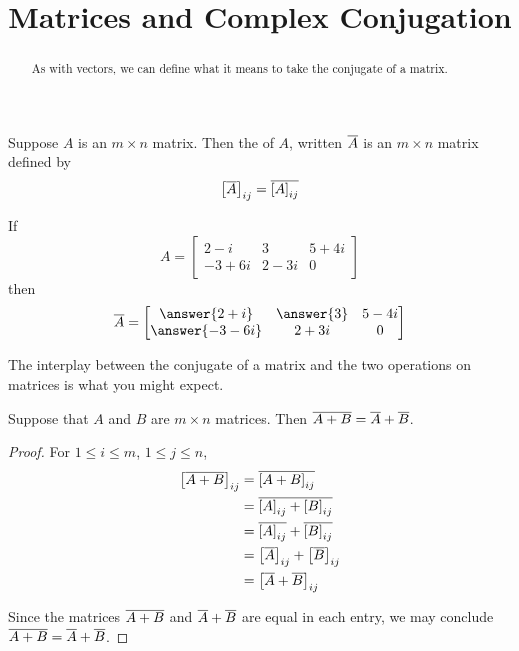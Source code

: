 \documentclass{ximera}
\title{Matrices and Complex Conjugation}
\begin{document}
\begin{abstract}
  As with vectors, we can define what it means to take the conjugate of a matrix.
\end{abstract}
\maketitle

\begin{definition}
Suppose $A$ is an $m\times n$ matrix.  Then the  of $A$, written $\overline{A}$ is an $m\times n$ matrix defined by
\[
\left\lbrack\overline{A}\right\rbrack_{ij}=\overline{\left\lbrack A\right\rbrack_{ij}}
\]
\end{definition}

\begin{example}
If
\[
A=
\begin{bmatrix}
2-i & 3 & 5+4i\\
-3+6i & 2-3i & 0
\end{bmatrix}
\]
then
\[
\conjugate{A}=
\begin{bmatrix}
\answer{2+i} & \answer{3} & 5-4i\\
\answer{-3-6i} & 2+3i & 0
\end{bmatrix}
\]

\end{example}

The interplay between the conjugate of a matrix and the two operations
on matrices is what you might expect.


\begin{theorem}
\label{theorem:CRMA}

Suppose that $A$ and $B$ are $m\times n$ matrices.  Then $\overline{A+B}=\overline{A}+\overline{B}$.

\begin{proof}
  For $1\leq i\leq m$, $1\leq j\leq n$,
  \begin{align*}
    \matrixentry{\conjugate{A+B}}{ij}
    &=\conjugate{\matrixentry{A+B}{ij}}\\ %
    &=\conjugate{\matrixentry{A}{ij}+\matrixentry{B}{ij}}\\ %
    &=\conjugate{\matrixentry{A}{ij}}+\conjugate{\matrixentry{B}{ij}}\\ %
    &=\matrixentry{\conjugate{A}}{ij}+\matrixentry{\conjugate{B}}{ij}\\ %
    &=\matrixentry{\conjugate{A}+\conjugate{B}}{ij}\\ %
  \end{align*}
  
  Since the matrices $\overline{A+B}$ and
  $\overline{A}+\overline{B}$ are equal in each entry,
  we may conclude
  $\overline{A+B}=\overline{A}+\overline{B}$.

\end{proof}
\end{theorem}
\end{document}

